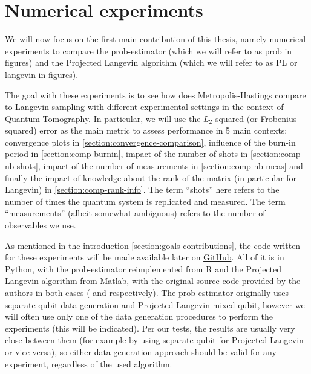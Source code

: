 \documentclass[12pt]{memoir}
\begin{document}
\chapter{Numerical experiments}\label{section:numerical-exp}
We will now focus on the first main contribution of this thesis, namely numerical experiments to compare the prob-estimator (which we will refer to as prob in figures) and the Projected Langevin algorithm (which we will refer to as PL or langevin in figures).\medbreak

The goal with these experiments is to see how does Metropolis-Hastings compare to Langevin sampling with different experimental settings in the context of Quantum Tomography. In particular, we will use the $L_2$ squared (or Frobenius squared) error as the main metric to assess performance in 5 main contexts: convergence plots in \ref{section:convergence-comparison}, influence of the burn-in period in \ref{section:comp-burnin}, impact of the number of shots in \ref{section:comp-nb-shots}, impact of the number of measurements in \ref{section:comp-nb-meas} and finally the impact of knowledge about the rank of the matrix (in particular for Langevin) in \ref{section:comp-rank-info}. The term ``shots'' here refers to the number of times the quantum system is replicated and measured. The term ``measurements'' (albeit somewhat ambiguous) refers to the number of observables we use. \medbreak

As mentioned in the introduction \ref{section:goals-contributions}, the code written for these experiments will be made available later on \href{https://github.com/daqwes/thesis}{GitHub}. All of it is in Python, with the prob-estimator reimplemented from R and the Projected Langevin algorithm from Matlab, with the original source code provided by the authors in both cases (\cite{MA17} and \cite{meth:bayesian:Langevin:ACMT2024} respectively). The prob-estimator originally uses separate qubit data generation and Projected Langevin mixed qubit, however we will often use only one of the data generation procedures to perform the experiments (this will be indicated). Per our tests, the results are usually very close between them (for example by using separate qubit for Projected Langevin or vice versa), so either data generation approach should be valid for any experiment, regardless of the used algorithm.\medbreak
\end{document}
